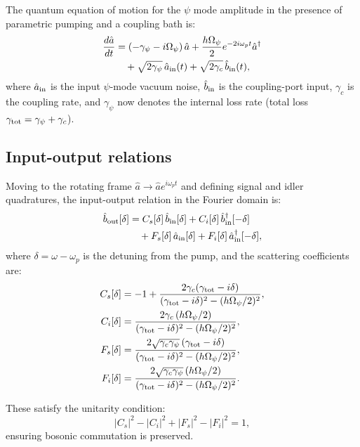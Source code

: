 \documentclass[12pt,aps,prd,twocolumn,superscriptaddress,nofootinbib]{revtex4-2}
\newcommand{\Opsi}{\Omega_\psi}
\newcommand{\gpsi}{\gamma_\psi}
\begin{document}
The quantum equation of motion for the $\psi$ mode amplitude in
the presence of parametric pumping and a coupling bath is:
\begin{align}
\frac{d\hat{a}}{dt} &= \left(-\gpsi - i\Opsi\right)\hat{a}
+ \frac{h\Opsi}{2}e^{-2i\omega_p t}\hat{a}^\dagger
\nonumber\\
&\quad + \sqrt{2\gpsi}\,\hat{a}_{\rm in}(t)
+ \sqrt{2\gamma_c}\,\hat{b}_{\rm in}(t),
\label{eq:langevin}
\end{align}
where $\hat{a}_{\rm in}$ is the input $\psi$-mode vacuum noise,
$\hat{b}_{\rm in}$ is the coupling-port input, $\gamma_c$ is the
coupling rate, and $\gpsi$ now denotes the internal loss rate
(total loss $\gamma_{\rm tot} = \gpsi + \gamma_c$).

\subsection{Input-output relations}

Moving to the rotating frame $\hat{a} \to \hat{a}e^{i\omega_p t}$
and defining signal and idler quadratures, the input-output
relation in the Fourier domain is:
\begin{align}
\hat{b}_{\rm out}[\delta] &= C_s[\delta]\,\hat{b}_{\rm in}[\delta]
+ C_i[\delta]\,\hat{b}_{\rm in}^\dagger[-\delta]
\nonumber\\
&\quad + F_s[\delta]\,\hat{a}_{\rm in}[\delta]
+ F_i[\delta]\,\hat{a}_{\rm in}^\dagger[-\delta],
\label{eq:io_relation}
\end{align}
where $\delta = \omega - \omega_p$ is the detuning from the pump,
and the scattering coefficients are:
\begin{align}
C_s[\delta] &= -1 + \frac{2\gamma_c(\gamma_{\rm tot}-i\delta)}
{(\gamma_{\rm tot}-i\delta)^2 - (h\Opsi/2)^2},
\label{eq:Cs}\\
C_i[\delta] &= \frac{2\gamma_c\,(h\Opsi/2)}
{(\gamma_{\rm tot}-i\delta)^2 - (h\Opsi/2)^2},
\label{eq:Ci}\\
F_s[\delta] &= \frac{2\sqrt{\gamma_c\gpsi}\,(\gamma_{\rm tot}-i\delta)}
{(\gamma_{\rm tot}-i\delta)^2 - (h\Opsi/2)^2},
\label{eq:Fs}\\
F_i[\delta] &= \frac{2\sqrt{\gamma_c\gpsi}\,(h\Opsi/2)}
{(\gamma_{\rm tot}-i\delta)^2 - (h\Opsi/2)^2}.
\label{eq:Fi}
\end{align}

These satisfy the unitarity condition:
\begin{equation}
|C_s|^2 - |C_i|^2 + |F_s|^2 - |F_i|^2 = 1,
\label{eq:unitarity}
\end{equation}
ensuring bosonic commutation is preserved.
\end{document}
